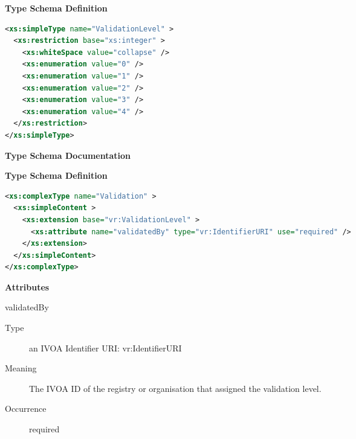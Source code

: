 \documentclass[11pt,a4paper]{ivoa}
\begin{document}
\begin{generated}
\begin{longtermsdescription}
\end{longtermsdescription}
\vspace{1ex}\noindent\textbf{ Type Schema Definition}

\begin{lstlisting}[language=XML,basicstyle=\footnotesize]
<xs:simpleType name="ValidationLevel" >
  <xs:restriction base="xs:integer" >
    <xs:whiteSpace value="collapse" />
    <xs:enumeration value="0" />
    <xs:enumeration value="1" />
    <xs:enumeration value="2" />
    <xs:enumeration value="3" />
    <xs:enumeration value="4" />
  </xs:restriction>
</xs:simpleType>
\end{lstlisting}\endgroup
\end{generated}


\begin{generated}
\begingroup
      	\renewcommand*\descriptionlabel[1]{%
      	\hbox to 5.5em{\emph{#1}\hfil}}\vspace{2ex}\noindent\textbf{ Type Schema Documentation}


\vspace{1ex}\noindent\textbf{ Type Schema Definition}

\begin{lstlisting}[language=XML,basicstyle=\footnotesize]
<xs:complexType name="Validation" >
  <xs:simpleContent >
    <xs:extension base="vr:ValidationLevel" >
      <xs:attribute name="validatedBy" type="vr:IdentifierURI" use="required" />
    </xs:extension>
  </xs:simpleContent>
</xs:complexType>
\end{lstlisting}

\vspace{0.5ex}\noindent\textbf{ Attributes}

\begingroup\small\begin{bigdescription}
\item[validatedBy]
\begin{description}
\item[Type] an IVOA Identifier URI: vr:IdentifierURI
\item[Meaning] 
               The IVOA ID of the registry or organisation that
               assigned the validation level.  
             
\item[Occurrence] required

\end{description}


\end{bigdescription}\endgroup

\endgroup
\end{generated}
\end{document}
